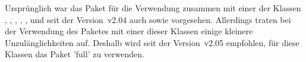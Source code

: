 \begin{Bundle*}[v2.02]{}
Ursprünglich war das Paket  für die Verwendung zusammen 
mit einer der Klassen , , , 
, ,  und seit der Version~v2.04 
auch  sowie  vorgesehen. Allerdings 
traten bei der Verwendung des Paketes mit einer dieser Klassen einige kleinere 
Unzulänglichkeiten auf. Deshalb wird seit der Version~v2.05 empfohlen, für 
diese Klassen das Paket 'full' zu verwenden.
\end{Bundle*}



